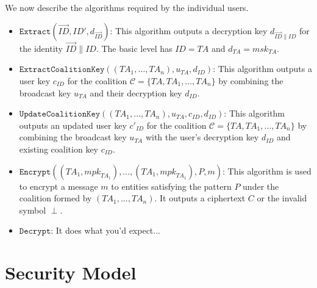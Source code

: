 \documentclass{llncs}
\newcommand{\ID}{\mathit{ID}}
\newcommand{\TA}{\mathit{TA}}
\newcommand{\mpk}{\mathit{mpk}}
\newcommand{\msk}{\mathit{msk}}
\begin{document}
We now describe the algorithms required by the individual users.
\begin{itemize}
\item $\texttt{Extract}(\vec{ID},\ID',d_{\vec{\ID}})$: This
algorithm outputs a decryption key $d_{\vec{\ID}\|\ID}$ for the
identity $\vec{\ID} \| \ID$. The basic level has $\ID=\TA$ and
$d_{\TA}=\msk_{\TA}$. \medskip

\item
$\texttt{ExtractCoalitionKey}((\TA_{1},\ldots,\TA_{n}),u_{\TA},d_{\ID})$:
This algorithm outputs a user key $c_{\ID}$ for the coalition
$\mathcal{C}=\{\TA,\TA_{1},\ldots,\TA_{n}\}$ by combining the
broadcast key $u_{\TA}$ and their decryption key $d_{\ID}$.\medskip

\item $\texttt{UpdateCoalitionKey}((\TA_{1},\ldots,\TA_{n}),u_{\TA},c_{\ID},d_{\ID})$:
This algorithm outputs an updated user key $c'_{\ID}$ for the
coalition $\mathcal{C}=\{\TA,\TA_{1},\ldots,\TA_{n}\}$ by combining
the broadcast key $u_{\TA}$ with the user's decryption key $d_{\ID}$
and existing coalition key $c_{\ID}$.\medskip

\item $\texttt{Encrypt}((\TA_{1},\mpk_{\TA_{1}}),\ldots,(\TA_{1},\mpk_{\TA_{1}}),\mathit{P},m)$:
This algorithm is used to encrypt a message $m$ to entities
satisfying the pattern $\mathit{P}$ under the coalition formed by
$(\TA_{1},\ldots,\TA_{n})$. It outputs a ciphertext $C$ or the
invalid symbol $\perp$.
\medskip

\item $\texttt{Decrypt}$: It does what you'd expect...
\end{itemize}

\section{Security Model}
\end{document}
